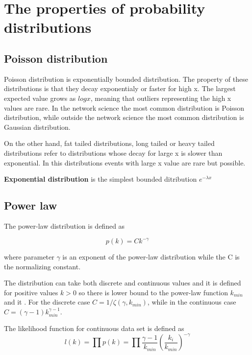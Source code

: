 \section{The properties of probability distributions}

\subsection{Poisson distribution}

Poisson distribution is exponentially bounded distribution. The property of these distributions is that they decay exponentialy or faster for high x. The largest expected value grows as $logx$, meaning that outliers representing the high x values are rare. In the network science the most common distribution is Poisson distribution, while outside the network science the most common distribution is Gaussian distribution. 

On the other hand, fat tailed distributions, long tailed or heavy tailed distributions refer to distributions whose decay for large x is slower than exponential. In this distributions events with large x value are rare but possible. 

\textbf{Exponential distribution} is the simplest bounded ditribution $e^{-\lambda x}$

\subsection{Power law}

The power-law distribution is defined as 

\begin{equation}
p(k) = C k^{-\gamma}
\end{equation}

where parameter $\gamma$ is an exponent of the power-law distribution while the C is the normalizing constant. 

The distribution can take both discrete and continuous values and it is defined for positive values $k>0$ so there is lower bound to the power-law function $k_{min}$ and it . For the discrete case $C=1/\zeta(\gamma, k_{min})$, while in the continuous case $C=(\gamma-1)k_{min}^{\gamma-1}$. 

The likelihood function for continuous data set is defined as 
\begin{equation}
l(k) = \prod p(k) = \prod \frac{\gamma - 1}{ k_{min}}(\frac{k_i}{k_{min}})^{-\gamma}
\end{equation}

